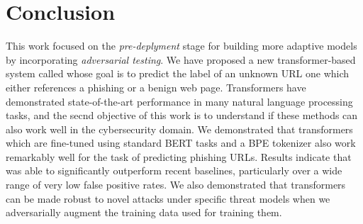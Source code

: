 \section{Conclusion}
\label{sec:conc}
%
This work focused on the \textit{pre-deplyment} stage for building more adaptive models by incorporating \textit{adversarial testing}.
We have proposed a new transformer-based system called \URLTranSys whose goal is to predict the label of an unknown URL one which either references a phishing or a benign web page.
Transformers have demonstrated state-of-the-art performance in many natural language processing tasks, and the secnd objective of this work is to understand if these methods can also work well in the cybersecurity domain.
We demonstrated that transformers which are fine-tuned using standard BERT tasks and a BPE tokenizer also work remarkably well for the task of predicting phishing URLs.
Results indicate that \URLTranSys was able to significantly outperform recent baselines, particularly over a wide range of very low false positive rates.
We also demonstrated that transformers can be made robust to novel attacks under specific threat models when we adversarially augment the training data used for training them. 